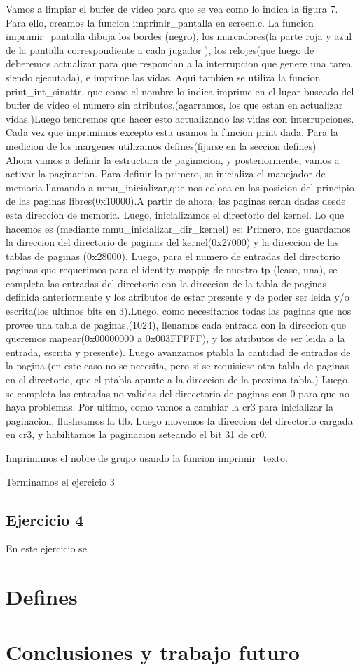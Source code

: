 \documentclass[a4paper]{article}
\begin{document}
Vamos a limpiar el buffer de video para que se vea como lo indica la figura 7. Para ello, creamos la funcion imprimir_pantalla en screen.c.
	La funcion imprimir_pantalla dibuja los bordes (negro), los marcadores(la parte roja y azul de la pantalla correspondiente a cada jugador ), los relojes(que luego de deberemos actualizar para que respondan a la interrupcion que genere una tarea siendo ejecutada), e imprime las vidas. Aqui tambien se utiliza la funcion print_int_sinattr, que como el nombre lo indica imprime en el lugar buscado del buffer de video el numero sin atributos,(agarramos, los que estan en actualizar vidas.)Luego tendremos que hacer esto actualizando las vidas con interrupciones. Cada vez que imprimimos excepto esta usamos la funcion print dada. Para la medicion de los margenes utilizamos defines(fijarse en la seccion defines)
	\\
	Ahora vamos a  definir la estructura de paginacion, y posteriormente, vamos a activar la paginacion.
	Para definir lo primero, se inicializa el manejador de memoria llamando a mmu_inicializar,que nos coloca en las posicion del principio de las paginas libres(0x10000).A partir de ahora, las paginas seran dadas desde esta direccion de memoria. Luego, inicializamos el directorio del kernel. 
	Lo que hacemos es (mediante  mmu_inicializar_dir_kernel)  es:
	Primero, nos guardamos la direccion del directorio de paginas del kernel(0x27000) y la direccion de las tablas de paginas (0x28000).
	Luego, para el numero de entradas del directorio paginas que requerimos para el identity mappig de nuestro tp (lease, una), se completa las entradas del directorio con la direccion de la tabla de paginas definida anteriormente y los atributos de estar presente y de poder ser leida y/o escrita(los ultimos bits en 3).Luego, como necesitamos todas las paginas que nos provee una tabla de paginas,(1024), llenamos cada entrada con la direccion que queremos mapear(0x00000000 a 0x003FFFFF), y  los atributos de ser leida a la entrada, escrita y presente). Luego avanzamos ptabla la cantidad de entradas de la pagina.(en este caso no se necesita, pero si se requisiese otra tabla de paginas en el directorio, que el ptabla apunte a la direccion de la proxima tabla.) Luego, se completa las entradas no validas del direcctorio de paginas con 0 para que no haya problemas.
	Por ultimo, como vamos a cambiar la cr3 para inicializar la paginacion, flusheamos la tlb.
	Luego movemos la direccion del directorio cargada en cr3, y habilitamos la paginacion seteando el bit 31 de cr0.

	Imprimimos el nobre de grupo usando la funcion imprimir_texto.
	 
	Terminamos el ejercicio 3

\subsection{Ejercicio 4}

En este ejercicio se 



\section{Defines}

\section{Conclusiones y trabajo futuro}
\end{document}
